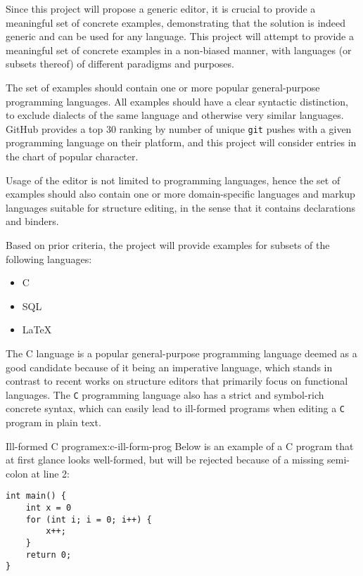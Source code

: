 Since this project will propose a generic editor, it is crucial to provide a meaningful set of concrete examples, demonstrating that the solution is indeed generic and can be used for any language.
This project will attempt to provide a meaningful set of concrete examples in a non-biased manner, with languages (or subsets thereof) of different paradigms and purposes.

The set of examples should contain one or more popular general-purpose programming languages.
All examples should have a clear syntactic distinction, to exclude dialects of the same language and otherwise very similar languages. \\ GitHub provides a top 30 ranking\cite{prog-lang-metrics} by number of unique \texttt{git} pushes with a given programming language on their platform, and this project will consider entries in the chart of popular character.

Usage of the editor is not limited to programming languages, hence the set of examples should also contain one or more domain-specific languages and markup languages suitable for structure editing, in the sense that it contains declarations and binders.

Based on prior criteria, the project will provide examples for subsets of the following languages:
\begin{itemize}
    \item C
    \item SQL
    \item \LaTeX
\end{itemize}

The C language\cite{c-iso-standard} is a popular general-purpose programming language deemed as a good candidate because of it being an imperative language, which stands in contrast to recent works on structure editors\cite{aalborg}\cite{godiksen}\cite{omar} that primarily focus on functional languages. The \texttt{C} programming language also has a strict and symbol-rich concrete syntax, which can easily lead to ill-formed programs when editing a \texttt{C} program in plain text.
\begin{example}{Ill-formed C program}{ex:c-ill-form-prog}
    Below is an example of a C program that at first glance looks well-formed, but will be rejected because of a missing semi-colon at line 2:
    \begin{lstlisting}
int main() {
    int x = 0
    for (int i; i = 0; i++) {
        x++;
    }
    return 0;
}
    \end{lstlisting}
\end{example}

